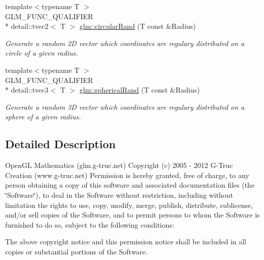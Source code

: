 \begin{DoxyCompactItemize}
{\footnotesize template$<$typename T $>$ }\\G\-L\-M\-\_\-\-F\-U\-N\-C\-\_\-\-Q\-U\-A\-L\-I\-F\-I\-E\-R \\*
detail\-::tvec2$<$ T $>$ \hyperlink{group__gtc__random_ga6e74477d1997a1bc2cf62bcc36167674}{glm\-::circular\-Rand} (T const \&Radius)
\begin{DoxyCompactList}\small\item\em Generate a random 2\-D vector which coordinates are regulary distributed on a circle of a given radius. \end{DoxyCompactList}\item 
{\footnotesize template$<$typename T $>$ }\\G\-L\-M\-\_\-\-F\-U\-N\-C\-\_\-\-Q\-U\-A\-L\-I\-F\-I\-E\-R \\*
detail\-::tvec3$<$ T $>$ \hyperlink{group__gtc__random_ga291f75129653fa6371d2d57d78f8aca6}{glm\-::spherical\-Rand} (T const \&Radius)
\begin{DoxyCompactList}\small\item\em Generate a random 3\-D vector which coordinates are regulary distributed on a sphere of a given radius. \end{DoxyCompactList}\end{DoxyCompactItemize}


\subsection{Detailed Description}
Open\-G\-L Mathematics (glm.\-g-\/truc.\-net) Copyright (c) 2005 -\/ 2012 G-\/\-Truc Creation (www.\-g-\/truc.\-net) Permission is hereby granted, free of charge, to any person obtaining a copy of this software and associated documentation files (the \char`\"{}\-Software\char`\"{}), to deal in the Software without restriction, including without limitation the rights to use, copy, modify, merge, publish, distribute, sublicense, and/or sell copies of the Software, and to permit persons to whom the Software is furnished to do so, subject to the following conditions\-:

The above copyright notice and this permission notice shall be included in all copies or substantial portions of the Software.

